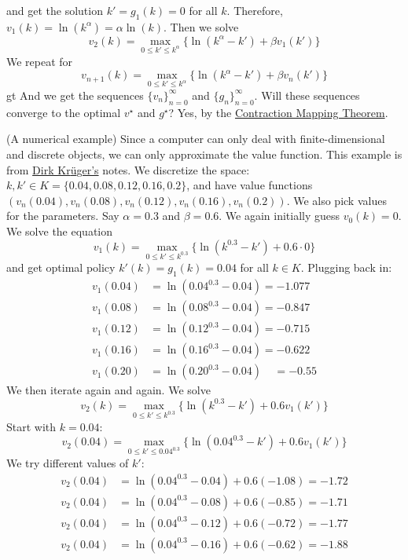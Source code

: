 \documentclass[10pt]{article}
\begin{document}
\begin{example}
\begin{enumerate}
\[		\]
		and get the solution $k' = g_1(k) = 0$ for all $k$. Therefore, $v_1(k) = \ln(k^\alpha) = \alpha \ln(k)$. Then we solve
		\[
		v_2(k) = \max_{0 \le k' \le k^\alpha} \{\ln(k^\alpha - k') + \beta v_1(k')\}
		\]
		We repeat for
		\[
		v_{n+1}(k) = \max_{0 \le k' \le k^\alpha} \{\ln(k^\alpha - k') + \beta v_n(k')\}
		\]gt
		And we get the sequences $\{v_n\}_{n=0}^\infty$ and $\{g_n\}_{n=0}^\infty$. Will these sequences converge to the optimal $v^\star$ and $g^\star$? Yes, by the \href{https://en.wikipedia.org/wiki/Banach_fixed-point_theorem}{Contraction Mapping Theorem}.
		\begin{example} (A numerical example)
			Since a computer can only deal with finite-dimensional and discrete objects, we can only approximate the value function. This example is from \href{https://web.sas.upenn.edu/dkrueger/}{Dirk Kr{\"u}ger's} notes. We discretize the space: $k,k' \in K = \{0.04,0.08,0.12,0.16,0.2\}$, and have value functions $(v_n(0.04),v_n(0.08),v_n(0.12),v_n(0.16),v_n(0.2))$. We also pick values for the parameters. Say $\alpha = 0.3$ and $\beta = 0.6$. We again initially guess $v_0(k) = 0$. We solve the equation
			\[
			v_1(k) = \max_{0 \le k' \le k^{0.3}} \{ \ln(k^{0.3} - k') + 0.6 \cdot 0\}
			\]
			and get optimal policy $k'(k) = g_1(k) = 0.04$ for all $k \in K$. Plugging back in:
			\begin{align*}
				v_1(0.04) &= \ln(0.04^{0.3} - 0.04) = -1.077 \\
				v_1(0.08) &= \ln(0.08^{0.3} - 0.04) = -0.847 \\
				v_1(0.12) &= \ln(0.12^{0.3} - 0.04) = -0.715 \\
				v_1(0.16) &= \ln(0.16^{0.3} - 0.04) = -0.622 \\
				v_1(0.20) &= \ln(0.20^{0.3} - 0.04) \;\;\;\;= -0.55
			\end{align*}
			We then iterate again and again. We solve
			\[
			v_2(k) = \max_{0 \le k' \le k^{0.3}}\{ \ln(k^{0.3} - k') + 0.6 v_1(k')\}
			\]
			Start with $k = 0.04$:
			\[
			v_2(0.04) = \max_{0 \le k' \le 0.04^{0.3}}\{ \ln(0.04^{0.3} - k') + 0.6 v_1(k')\}
			\]
			We try different values of $k'$:
			\begin{align*}
				v_2(0.04) &= \ln(0.04^{0.3} - 0.04) + 0.6 (-1.08) = -1.72 \\
				v_2(0.04) &= \ln(0.04^{0.3} - 0.08) + 0.6 (-0.85) = -1.71 \\
				v_2(0.04) &= \ln(0.04^{0.3} - 0.12) + 0.6 (-0.72) = -1.77 \\
				v_2(0.04) &= \ln(0.04^{0.3} - 0.16) + 0.6 (-0.62) = -1.88 \\

\end{align*}
\end{example}
\end{enumerate}
\end{example}
\end{document}
